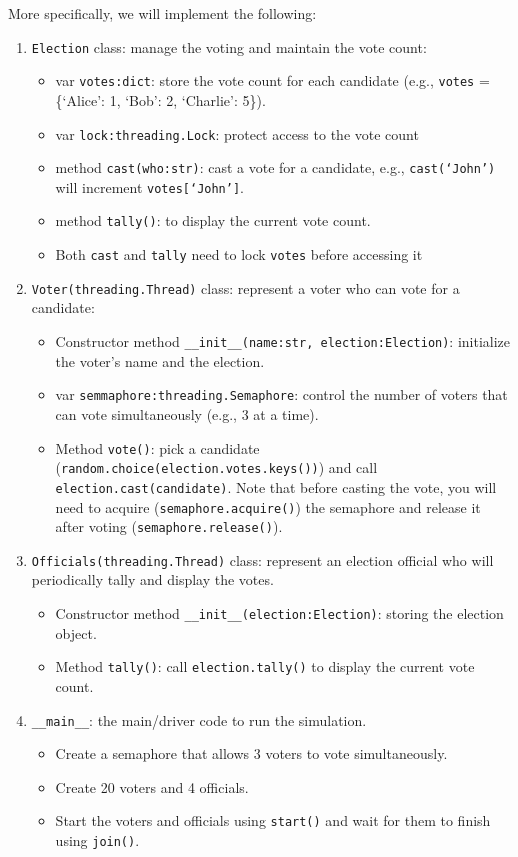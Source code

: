 \documentclass[oneside,11pt,dvipsnames]{book}
\newcommand{\code}[1]{\texttt{#1}}
\begin{document}
More specifically, we will implement the following: 
\begin{enumerate}
\item \code{Election} class: manage the voting and maintain the vote count:
\begin{itemize}
    \item var \code{votes:dict}: store the vote count for each candidate (e.g., \code{votes} = \{`Alice': 1, `Bob': 2, `Charlie': 5\}).
    \item var \code{lock:threading.Lock}: protect access to the vote count
    \item method \code{cast(who:str)}: cast a vote for a candidate, e.g., \code{cast(`John')} will increment \code{votes[`John']}.
    \item method \code{tally()}: to display the current vote count. 
    \item Both \code{cast} and \code{tally} need to lock \code{votes} before accessing it
\end{itemize}
\item \code{Voter(threading.Thread)} class: represent a voter who can vote for a candidate:
\begin{itemize}
    \item Constructor method \code{\_\_init\_\_(name:str, election:Election)}: initialize the voter's name and the election.
    \item var \code{semmaphore:threading.Semaphore}: control the number of voters that can vote simultaneously (e.g., 3 at a time).
    \item Method \code{vote()}: pick a candidate (\code{random.choice(election.votes.keys())}) and call \code{election.cast(candidate)}. Note that before casting the vote, you will need to acquire (\code{semaphore.acquire()}) the semaphore and release it after voting (\code{semaphore.release()}).
\end{itemize}
\item \code{Officials(threading.Thread)} class: represent an election official who will periodically tally and display the votes.
\begin{itemize}
    \item Constructor method \code{\_\_init\_\_(election:Election)}: storing the election object.
    \item Method \code{tally()}: call \code{election.tally()} to display the current vote count.
\end{itemize}
\item \code{\_\_main\_\_}: the main/driver code to run the simulation.
    \begin{itemize}
        \item Create a semaphore that allows 3 voters to vote simultaneously.
        \item Create 20 voters and 4 officials.
        \item Start the voters and officials using \code{start()} and wait for them to finish using \code{join()}.
    \end{itemize}
\end{enumerate}
\end{document}
